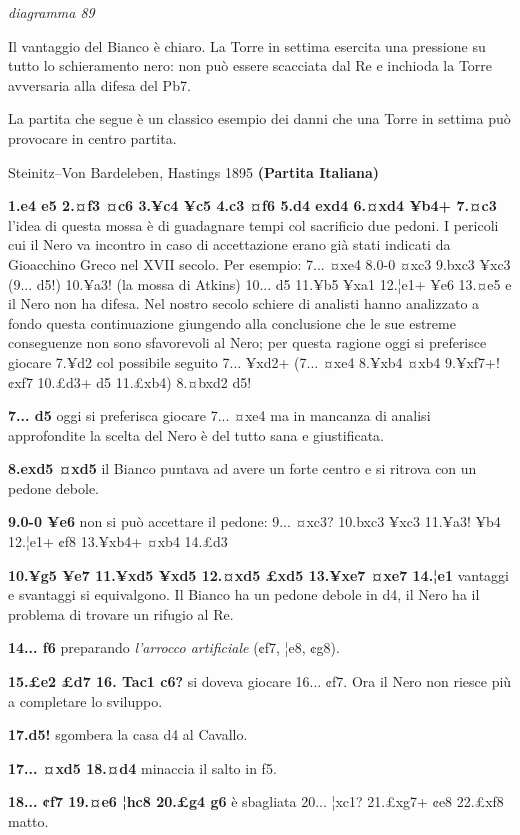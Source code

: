 \documentclass[
]{article}
\begin{document}
\emph{diagramma 89}

Il vantaggio del Bianco è chiaro. La Torre in settima esercita una
pressione su tutto lo schieramento nero: non può essere scacciata dal Re
e inchioda la Torre avversaria alla difesa del Pb7.

La partita che segue è un classico esempio dei danni che una Torre in
settima può provocare in centro partita.

Steinitz--Von Bardeleben, Hastings 1895 \textbf{(Partita Italiana)}

\textbf{1.e4 e5 2.¤f3 ¤c6 3.¥c4 ¥c5 4.c3 ¤f6 5.d4 exd4 6.¤xd4 ¥b4+
7.¤c3} l'idea di questa mossa è di guadagnare tempi col sacrificio due
pedoni. I pericoli cui il Nero va incontro in caso di accettazione erano
già stati indicati da Gioacchino Greco nel XVII secolo. Per esempio:
7... ¤xe4 8.0-0 ¤xc3 9.bxc3 ¥xc3 (9... d5!) 10.¥a3! (la mossa di Atkins)
10... d5 11.¥b5 ¥xa1 12.¦e1+ ¥e6 13.¤e5 e il Nero non ha difesa. Nel
nostro secolo schiere di analisti hanno analizzato a fondo questa
continuazione giungendo alla conclusione che le sue estreme conseguenze
non sono sfavorevoli al Nero; per questa ragione oggi si preferisce
giocare 7.¥d2 col possibile seguito 7... ¥xd2+ (7... ¤xe4 8.¥xb4 ¤xb4
9.¥xf7+! ¢xf7 10.£d3+ d5 11.£xb4) 8.¤bxd2 d5!

\textbf{7... d5} oggi si preferisca giocare 7... ¤xe4 ma in mancanza di
analisi approfondite la scelta del Nero è del tutto sana e giustificata.

\textbf{8.exd5 ¤xd5} il Bianco puntava ad avere un forte centro e si
ritrova con un pedone debole.

\textbf{9.0-0 ¥e6} non si può accettare il pedone: 9... ¤xc3? 10.bxc3
¥xc3 11.¥a3! ¥b4 12.¦e1+ ¢f8 13.¥xb4+ ¤xb4 14.£d3

\textbf{10.¥g5 ¥e7 11.¥xd5 ¥xd5 12.¤xd5 £xd5 13.¥xe7 ¤xe7 14.¦e1}
vantaggi e svantaggi si equivalgono. Il Bianco ha un pedone debole in
d4, il Nero ha il problema di trovare un rifugio al Re.

\textbf{14... f6} preparando \emph{l'arrocco artificiale} (¢f7, ¦e8,
¢g8).

\textbf{15.£e2 £d7 16. Tac1 c6?} si doveva giocare 16... ¢f7. Ora il
Nero non riesce più a completare lo sviluppo.

\textbf{17.d5!} sgombera la casa d4 al Cavallo.

\textbf{17... ¤xd5 18.¤d4} minaccia il salto in f5.

\textbf{18... ¢f7 19.¤e6 ¦hc8 20.£g4 g6} è sbagliata 20... ¦xc1?
21.£xg7+ ¢e8 22.£xf8 matto.
\end{document}

